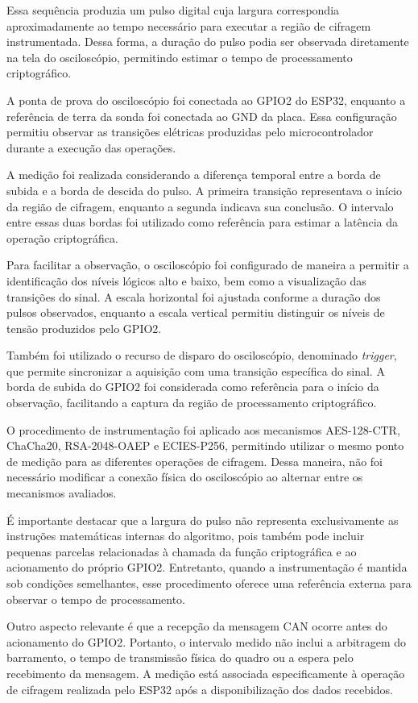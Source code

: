 Essa sequência produzia um pulso digital cuja largura correspondia aproximadamente ao tempo necessário para executar a região de cifragem instrumentada. Dessa forma, a duração do pulso podia ser observada diretamente na tela do osciloscópio, permitindo estimar o tempo de processamento criptográfico.

A ponta de prova do osciloscópio foi conectada ao GPIO2 do ESP32, enquanto a referência de terra da sonda foi conectada ao GND da placa. Essa configuração permitiu observar as transições elétricas produzidas pelo microcontrolador durante a execução das operações.

A medição foi realizada considerando a diferença temporal entre a borda de subida e a borda de descida do pulso. A primeira transição representava o início da região de cifragem, enquanto a segunda indicava sua conclusão. O intervalo entre essas duas bordas foi utilizado como referência para estimar a latência da operação criptográfica.

Para facilitar a observação, o osciloscópio foi configurado de maneira a permitir a identificação dos níveis lógicos alto e baixo, bem como a visualização das transições do sinal. A escala horizontal foi ajustada conforme a duração dos pulsos observados, enquanto a escala vertical permitiu distinguir os níveis de tensão produzidos pelo GPIO2.

Também foi utilizado o recurso de disparo do osciloscópio, denominado \textit{trigger}, que permite sincronizar a aquisição com uma transição específica do sinal. A borda de subida do GPIO2 foi considerada como referência para o início da observação, facilitando a captura da região de processamento criptográfico.

O procedimento de instrumentação foi aplicado aos mecanismos AES-128-CTR, ChaCha20, RSA-2048-OAEP e ECIES-P256, permitindo utilizar o mesmo ponto de medição para as diferentes operações de cifragem. Dessa maneira, não foi necessário modificar a conexão física do osciloscópio ao alternar entre os mecanismos avaliados.

É importante destacar que a largura do pulso não representa exclusivamente as instruções matemáticas internas do algoritmo, pois também pode incluir pequenas parcelas relacionadas à chamada da função criptográfica e ao acionamento do próprio GPIO2. Entretanto, quando a instrumentação é mantida sob condições semelhantes, esse procedimento oferece uma referência externa para observar o tempo de processamento.

Outro aspecto relevante é que a recepção da mensagem CAN ocorre antes do acionamento do GPIO2. Portanto, o intervalo medido não inclui a arbitragem do barramento, o tempo de transmissão física do quadro ou a espera pelo recebimento da mensagem. A medição está associada especificamente à operação de cifragem realizada pelo ESP32 após a disponibilização dos dados recebidos.

